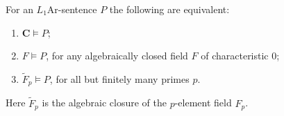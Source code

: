 For an $L_1\text{Ar}$-sentence $P$ the following are equivalent:

\begin{enumerate}
\item[(i)] $\mathbf{C} \vDash P$;
\item[(ii)] $F \vDash P$, for any algebraically closed field $F$ of characteristic $0$;
\item[(iii)] $\tilde{F}_p \vDash P$, for all but finitely many primes $p$.
\end{enumerate}

Here $\tilde{F}_p$ is the algebraic closure of the $p$-element field $F_p$.
